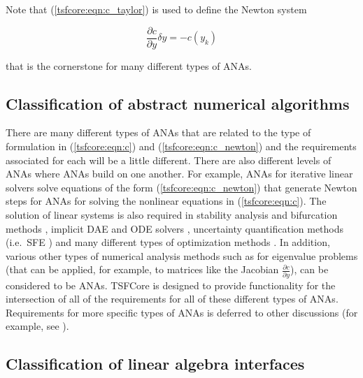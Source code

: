 Note that (\ref{tsfcore:eqn:c_taylor}) is used to define the 
Newton system

\begin{equation}
\frac{\partial c}{\partial y} \delta y = - c(y_k)
\label{tsfcore:eqn:c_newton}
\end{equation}

that is the cornerstone for many different types of ANAs.

%
\subsection{Classification of abstract numerical algorithms}
\label{tsfcore:sec:classification_of_ANAs}
%

There are many different types of ANAs that are related to the type of
formulation in (\ref{tsfcore:eqn:c}) and (\ref{tsfcore:eqn:c_newton})
and the requirements associated for each will be a little different.
There are also different levels of ANAs where ANAs build on one
another.  For example, ANAs for iterative linear solvers
\cite{ref:tmpls_for_iter_systems} solve equations of the form
(\ref{tsfcore:eqn:c_newton}) that generate Newton steps for ANAs for
solving the nonlinear equations \cite{JEDennis_RBSchnabel_1996} in
(\ref{tsfcore:eqn:c}).  The solution of linear systems is also
required in stability analysis and bifurcation methods
\cite{salinger99a}, implicit DAE and ODE solvers
\cite{ref:numerical_analysis_burden}, uncertainty quantification methods
(i.e.~SFE \cite{ref:sfe}) and many different types of optimization
methods \cite{ref:nocedal_wright_1999}.  In addition, various other
types of numerical analysis methods such as for eigenvalue problems
\cite{maschhoff96} (that can be applied, for example, to matrices like the
Jacobian $\frac{\partial c}{\partial y}$), can be considered to be
ANAs.  TSFCore is designed to provide functionality for the
intersection of all of the requirements for all of these different
types of ANAs.  Requirements for more specific types of ANAs is
deferred to other discussions (for example, see
\cite{ref:TSFCore::Nonlin}).

%
\subsection{Classification of linear algebra interfaces}
\label{tsfcore:sec:classification_of_lin_alg_itfc}
%

